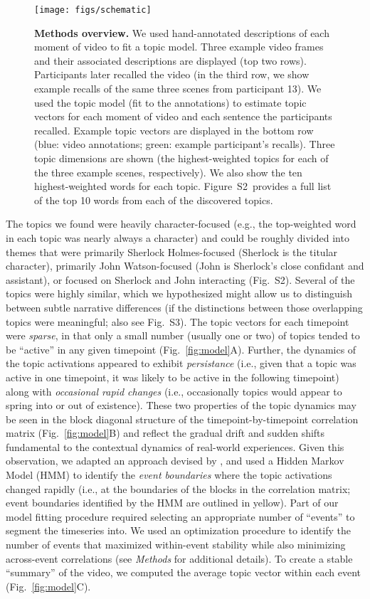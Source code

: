 \documentclass{article}
\newcommand{\topics}{S2}
\newcommand{\featureimportance}{S3}
\begin{document}
\begin{figure}[tp]
\centering
\texttt{[image: figs/schematic]}
\caption{\small \textbf{Methods overview.} We used hand-annotated descriptions of each moment of video to fit a topic model.  Three example video frames and their associated descriptions are displayed (top two rows).  Participants later recalled the video (in the third row, we show example recalls of the same three scenes from participant 13).  We used the topic model (fit to the annotations) to estimate topic vectors for each moment of video and each sentence the participants recalled.  Example topic vectors are displayed in the bottom row (blue: video annotations; green: example participant's recalls).  Three topic dimensions are shown (the highest-weighted topics for each of the three example scenes, respectively).  We also show the ten highest-weighted words for each topic.  Figure~\topics~provides a full list of the top 10 words from each of the discovered topics.}
\label{fig:schematic}
\end{figure}

The topics we found were heavily character-focused (e.g., the top-weighted word in each topic was nearly always a character) and could be roughly divided into themes that were primarily Sherlock Holmes-focused (Sherlock is the titular character), primarily John Watson-focused (John is Sherlock's close confidant and assistant), or focused on Sherlock and John interacting (Fig.~\topics).  Several of the topics were highly similar, which we hypothesized might allow us to distinguish between subtle narrative differences (if the distinctions between those overlapping topics were meaningful; also see Fig.~\featureimportance).  The topic vectors for each timepoint were \textit{sparse}, in that only a small number (usually one or two) of topics tended to be ``active'' in any given timepoint (Fig.~\ref{fig:model}A).  Further, the dynamics of the topic activations appeared to exhibit \textit{persistance} (i.e., given that a topic was active in one timepoint, it was likely to be active in the following timepoint) along with \textit{occasional rapid changes} (i.e., occasionally topics would appear to spring into or out of existence).  These two properties of the topic dynamics may be seen in the block diagonal structure of the timepoint-by-timepoint correlation matrix (Fig.~\ref{fig:model}B) and reflect the gradual drift and sudden shifts fundamental to the contextual dynamics of real-world experiences.  Given this observation, we adapted an approach devised by \cite{BaldEtal17}, and used a Hidden Markov Model (HMM) to identify the \textit{event boundaries} where the topic activations changed rapidly (i.e., at the boundaries of the blocks in the correlation matrix; event boundaries identified by the HMM are outlined in yellow).  Part of our model fitting procedure required selecting an appropriate number of ``events'' to segment the timeseries into.  We used an optimization procedure to identify the number of events that maximized within-event stability while also minimizing across-event correlations (see \textit{Methods} for additional details).  To create a stable ``summary'' of the video, we computed the average topic vector within each event (Fig.~\ref{fig:model}C).
\end{document}
